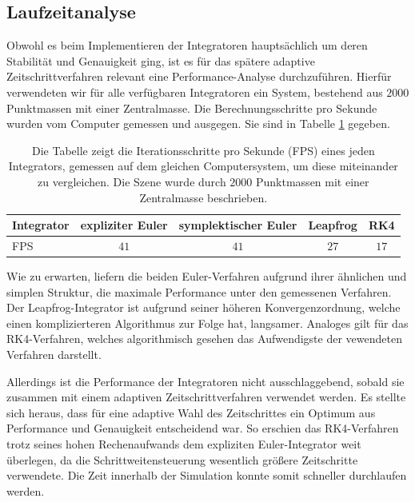 
  \subsection{Laufzeitanalyse} %
  \label{sub:laufzeitanalyse}

    Obwohl es beim Implementieren der Integratoren hauptsächlich um deren Stabilität und Genauigkeit ging, ist es für das spätere adaptive Zeitschrittverfahren relevant eine Performance-Analyse durchzuführen.
    Hierfür verwendeten wir für alle verfügbaren Integratoren ein System, bestehend aus $2000$ Punktmassen mit einer Zentralmasse.
    Die Berechnungsschritte pro Sekunde wurden vom Computer gemessen und ausgegen.
    Sie sind in Tabelle \ref{tab:fps} gegeben.

    \begin{table}[h]
      \caption{Die Tabelle zeigt die Iterationsschritte pro Sekunde (FPS) eines jeden Integrators, gemessen auf dem gleichen Computersystem, um diese miteinander zu vergleichen. Die Szene wurde durch $2000$ Punktmassen mit einer Zentralmasse beschrieben.}
      \label{tab:fps}
      \center
      \begin{tabular}{lcccc}
        \hline
        \hline
        Integrator & expliziter Euler & symplektischer Euler & Leapfrog & RK4 \\
        \hline
        FPS & $41$ & $41$ & $27$ & $17$ \\
        \hline
        \hline
      \end{tabular}
    \end{table}

    Wie zu erwarten, liefern die beiden Euler-Verfahren aufgrund ihrer ähnlichen und simplen Struktur, die maximale Performance unter den gemessenen Verfahren.
    Der Leapfrog-Integrator ist aufgrund seiner höheren Konvergenzordnung, welche einen komplizierteren Algorithmus zur Folge hat, langsamer.
    Analoges gilt für das RK4-Verfahren, welches algorithmisch gesehen das Aufwendigste der vewendeten Verfahren darstellt.

    Allerdings ist die Performance der Integratoren nicht ausschlaggebend, sobald sie zusammen mit einem adaptiven Zeitschrittverfahren verwendet werden.
    Es stellte sich heraus, dass für eine adaptive Wahl des Zeitschrittes ein Optimum aus Performance und Genauigkeit entscheidend war.
    So erschien das RK4-Verfahren trotz seines hohen Rechenaufwands dem expliziten Euler-Integrator weit überlegen, da die Schrittweitensteuerung wesentlich größere Zeitschritte verwendete.
    Die Zeit innerhalb der Simulation konnte somit schneller durchlaufen werden.

